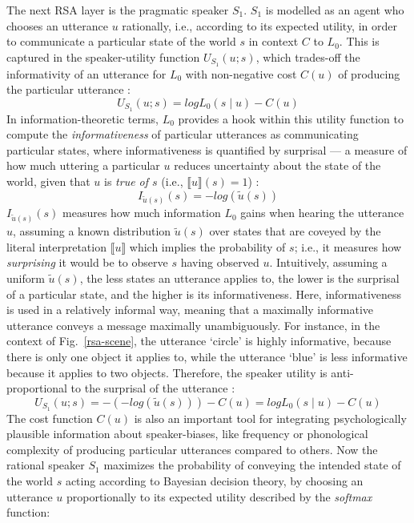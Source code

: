 The next RSA layer is the pragmatic speaker $S_1$. $S_1$ is modelled as an agent who chooses an utterance $u$ rationally, i.e., according to its expected utility, in order to communicate a particular state of the world $s$ in context $C$ to $L_0$. This is captured in the speaker-utility function $U_{S_1}(u; s)$, which trades-off the informativity of an utterance for $L_0$ with non-negative cost $C(u)$ of producing the particular utterance \parencite{problang}:
\begin{equation}
U_{S_1} (u;s) = log L_0(s \mid u) - C(u)
\end{equation}
In information-theoretic terms, $L_0$ provides a hook within this utility function to compute the \emph{informativeness} of particular utterances as communicating particular states, 
where informativeness is quantified by surprisal --- a measure of how much uttering a particular $u$ reduces uncertainty about the state of the world, given that $u$ is \emph{true of $s$} (i.e., $\llbracket u \rrbracket (s) = 1$) \parencite{frank2012predicting}: 
\begin{equation}
I_{ \tilde{u} (s)}(s) = -log(\tilde{u} (s))
\end{equation}
$I_{\tilde{u} (s)}(s)$ measures how much information $L_0$ gains when hearing the utterance $u$, assuming a known distribution $\tilde{u} (s)$ over states that are coveyed by the literal interpretation $\llbracket u \rrbracket$ which implies the probability of $s$; i.e., it measures how \emph{surprising} it would be to observe $s$ having observed $u$.
Intuitively, assuming a uniform $\tilde{u} (s)$, the less states an utterance applies to, the lower is the surprisal of a particular state, and the higher is its informativeness. Here, informativeness is used in a relatively informal way, meaning that a maximally informative utterance conveys a message maximally unambiguously. For instance, in the context of Fig.~\ref{rsa-scene}, the utterance `circle' is highly informative, because there is only one object it applies to, while the utterance `blue' is less informative because it applies to two objects. 
Therefore, the speaker utility is anti-proportional to the surprisal of the utterance \parencite{frank2012predicting}:
\begin{equation}
U_{S_1} (u;s) = -(-log(\tilde{u}(s))) - C(u) = log L_0(s \mid u) - C(u)
\end{equation}
The cost function $C(u)$ is also an important tool for integrating psychologically plausible information about speaker-biases, like frequency or phonological complexity of producing particular utterances compared to others. Now the rational speaker $S_1$ maximizes the probability of conveying the intended state of the world $s$ acting according to Bayesian decision theory, by choosing an utterance $u$ proportionally to its expected utility described by the \emph{softmax} function:

